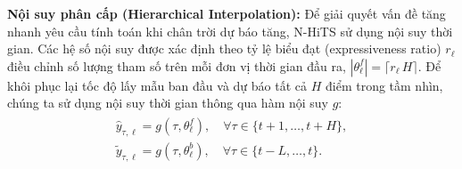 \textbf{Nội suy phân cấp (Hierarchical Interpolation):}
Để giải quyết vấn đề tăng nhanh yêu cầu tính toán khi chân trời dự báo tăng, N-HiTS sử dụng nội suy thời gian. Các hệ số nội suy được xác định theo tỷ lệ biểu đạt (expressiveness ratio) \(r_{\ell}\) điều chỉnh số lượng tham số trên mỗi đơn vị thời gian đầu ra, $|\theta^{f}_{\ell}|= \lceil r_{\ell} \, H \rceil$. Để khôi phục lại tốc độ lấy mẫu ban đầu và dự báo tất cả $H$ điểm trong tầm nhìn, chúng ta sử dụng nội suy thời gian thông qua hàm nội suy $g$:
\begin{align*}
\begin{split}
    \hat{y}_{\tau,\ell}   = g(\tau, \theta^{f}_{\ell}), \quad \forall \tau \in \{t+1,\dots,t+H\}, \\
    \tilde{y}_{\tau,\ell} = g(\tau, \theta^{b}_{\ell}), \quad \forall \tau \in \{t-L,\dots,t\}. 
\end{split}
\end{align*}